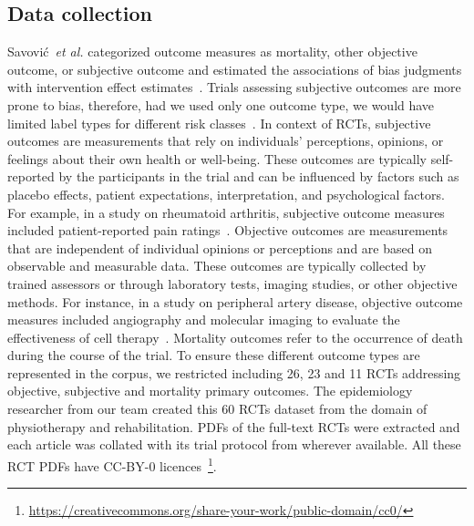 \documentclass[sn-mathphys,Numbered]{sn-jnl}%
\theoremstyle{thmstyleone}%
\theoremstyle{thmstyletwo}%
\theoremstyle{thmstylethree}%
\begin{document}
\subsection{Data collection}
\label{data}
%
Savović~\textit{et al.} categorized outcome measures as mortality, other objective outcome, or subjective outcome and estimated the associations of bias judgments with intervention effect estimates~\cite{savovic2018association}.
Trials assessing subjective outcomes are more prone to bias, therefore, had we used only one outcome type, we would have limited label types for different risk classes~\cite{page2016empirical}.
In context of RCTs, subjective outcomes are measurements that rely on individuals' perceptions, opinions, or feelings about their own health or well-being.
These outcomes are typically self-reported by the participants in the trial and can be influenced by factors such as  placebo effects, patient expectations, interpretation, and psychological factors.
For example, in a study on rheumatoid arthritis, subjective outcome measures included patient-reported pain ratings~\cite{vollert2020assessment}.
Objective outcomes are measurements that are independent of individual opinions or perceptions and are based on observable and measurable data.
These outcomes are typically collected by trained assessors or through laboratory tests, imaging studies, or other objective methods.
For instance, in a study on peripheral artery disease, objective outcome measures included angiography and molecular imaging to evaluate the effectiveness of cell therapy~\cite{grimaldi2016imaging}.
Mortality outcomes refer to the occurrence of death during the course of the trial.
To ensure these different outcome types are represented in the corpus, we restricted including 26, 23 and 11 RCTs addressing objective, subjective and mortality primary outcomes. %
The epidemiology researcher from our team created this 60 RCTs dataset from the domain of physiotherapy and rehabilitation.
PDFs of the full-text RCTs were extracted and each article was collated with its trial protocol from wherever available.
All these RCT PDFs have CC-BY-0 licences~\footnote{\url{https://creativecommons.org/share-your-work/public-domain/cc0/}}.
\end{document}
